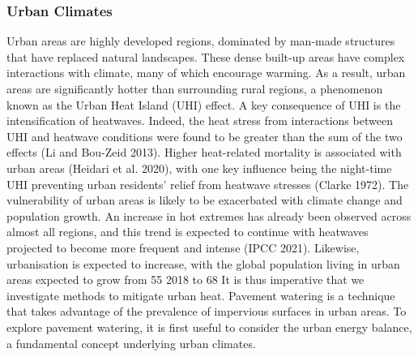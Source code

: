 \documentclass[final,3p,times,authoryear]{elsarticle}
\begin{document}
\subsubsection{Urban Climates}\label{sec:appendix7.1.2}
Urban areas are highly developed regions, dominated by man-made structures that have
replaced natural landscapes. These dense built-up areas have complex interactions with
climate, many of which encourage warming. As a result, urban areas are significantly
hotter than surrounding rural regions, a phenomenon known as the Urban Heat Island
(UHI) effect.
A key consequence of UHI is the intensification of heatwaves. Indeed, the heat stress
from interactions between UHI and heatwave conditions were found to be greater than the sum of the two effects (Li and Bou-Zeid 2013). Higher heat-related mortality is
associated with urban areas (Heidari et al. 2020), with one key influence being the
night-time UHI preventing urban residents’ relief from heatwave stresses (Clarke 1972).
The vulnerability of urban areas is likely to be exacerbated with climate change and
population growth. An increase in hot extremes has already been observed across
almost all regions, and this trend is expected to continue with heatwaves projected to
become more frequent and intense (IPCC 2021). Likewise, urbanisation is expected to
increase, with the global population living in urban areas expected to grow from 55 %
2018 to 68 %
It is thus imperative that we investigate methods to mitigate urban heat. Pavement
watering is a technique that takes advantage of the prevalence of impervious surfaces in
urban areas. To explore pavement watering, it is first useful to consider the urban
energy balance, a fundamental concept underlying urban climates.
\end{document}
